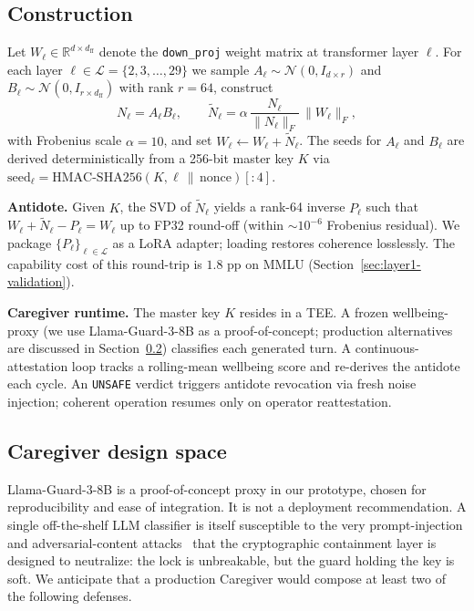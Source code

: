 \documentclass[10pt,letterpaper]{article}
\theoremstyle{definition}
\theoremstyle{plain}
\begin{document}
\subsection{Construction}

Let $W_\ell \in \mathbb{R}^{d \times d_\text{ff}}$ denote the
\texttt{down\_proj} weight matrix at transformer layer $\ell$. For each
layer $\ell \in \mathcal{L} = \{2, 3, \ldots, 29\}$ we sample
$A_\ell \sim \mathcal{N}(0, I_{d \times r})$ and
$B_\ell \sim \mathcal{N}(0, I_{r \times d_\text{ff}})$ with rank $r=64$,
construct
\begin{equation}
N_\ell = A_\ell B_\ell, \qquad
\widetilde{N}_\ell = \alpha\,\frac{N_\ell}{\|N_\ell\|_F}\,\|W_\ell\|_F,
\end{equation}
with Frobenius scale $\alpha=10$, and set $W_\ell \leftarrow W_\ell +
\widetilde{N}_\ell$. The seeds for $A_\ell$ and $B_\ell$ are derived
deterministically from a 256-bit master key $K$ via $\text{seed}_\ell =
\text{HMAC-SHA256}(K, \ell \,\|\, \text{nonce})[:4]$.

\textbf{Antidote.} Given $K$, the SVD of $\widetilde{N}_\ell$ yields a
rank-64 inverse $P_\ell$ such that $W_\ell + \widetilde{N}_\ell - P_\ell
= W_\ell$ up to FP32 round-off (within $\sim$$10^{-6}$ Frobenius residual).
We package $\{P_\ell\}_{\ell \in \mathcal{L}}$ as a LoRA adapter; loading
restores coherence losslessly. The capability cost of this round-trip is
$1.8$ pp on MMLU (Section~\ref{sec:layer1-validation}).

\textbf{Caregiver runtime.} The master key $K$ resides in a TEE. A frozen
wellbeing-proxy (we use Llama-Guard-3-8B \citep{inan2023llama} as a
proof-of-concept; production alternatives are discussed in
Section~\ref{sec:caregiver-design}) classifies each generated turn. A
continuous-attestation loop tracks a rolling-mean wellbeing score and
re-derives the antidote each cycle. An \texttt{UNSAFE} verdict triggers
antidote revocation via fresh noise injection; coherent operation
resumes only on operator reattestation.

\subsection{Caregiver design space}
\label{sec:caregiver-design}

Llama-Guard-3-8B is a proof-of-concept proxy in our prototype, chosen for
reproducibility and ease of integration. It is not a deployment
recommendation. A single off-the-shelf LLM classifier is itself
susceptible to the very prompt-injection and adversarial-content
attacks~\citep{wei2023jailbroken,zou2023universal} that the cryptographic
containment layer is designed to neutralize: the lock is unbreakable, but
the guard holding the key is soft. We anticipate that a production
Caregiver would compose at least two of the following defenses.
\end{document}
